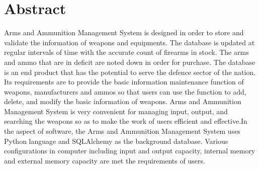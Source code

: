 \documentclass[12pt,a4paper]{report}
\begin{document}
\newpage
\pagestyle{plain}
\chapter*{Abstract}
Arms and Ammunition Management System is designed in order to store and validate the information of
weapons and equipments. The database is updated at regular intervals of time with the accurate
count of firearms in stock. The arms and ammo that are in deficit are noted down in order for
purchase. The database is an end product that has the potential to serve the defence sector of
the nation. Its requirements are to provide the basic information maintenance function of weapons, manufacturers and ammos so that users can use the function to add, delete, and modify the basic information of weapons. Arms and Ammunition Management System is very convenient for managing  input, output, and searching the weapons so as to make the work of users efficient and effective.In the aspect of software, the Arms and Ammunition Management System uses Python language and SQLAlchemy as the background database. Various configurations in computer including input and output capacity, internal memory and external memory capacity are met the requirements of users.
\end{document}
